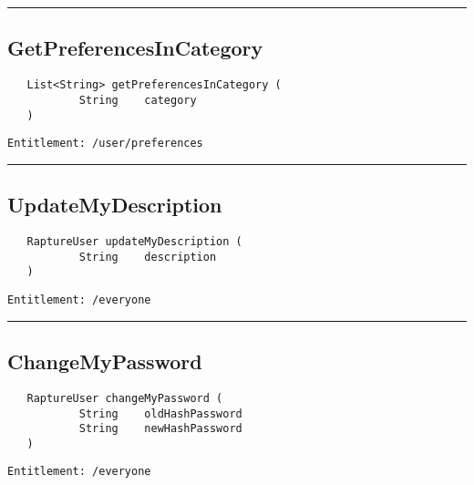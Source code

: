 \rule{12cm}{2pt}
\subsection{GetPreferencesInCategory}
\label{Api:GetPreferencesInCategory}
\begin{Verbatim}
   List<String> getPreferencesInCategory (
           String    category
   )
\end{Verbatim}
\begin{Verbatim}[formatcom=\color{Maroon}]
  Entitlement: /user/preferences
\end{Verbatim}



\rule{12cm}{2pt}
\subsection{UpdateMyDescription}
\label{Api:UpdateMyDescription}
\begin{Verbatim}
   RaptureUser updateMyDescription (
           String    description
   )
\end{Verbatim}
\begin{Verbatim}[formatcom=\color{Maroon}]
  Entitlement: /everyone
\end{Verbatim}



\rule{12cm}{2pt}
\subsection{ChangeMyPassword}
\label{Api:ChangeMyPassword}
\begin{Verbatim}
   RaptureUser changeMyPassword (
           String    oldHashPassword
           String    newHashPassword
   )
\end{Verbatim}
\begin{Verbatim}[formatcom=\color{Maroon}]
  Entitlement: /everyone
\end{Verbatim}




